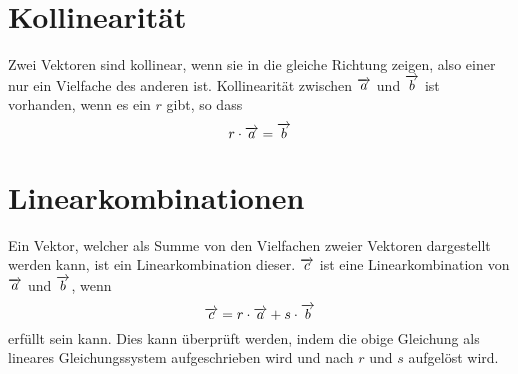 \documentclass{article}
\begin{document}
\section{Kollinearität} 
Zwei Vektoren sind kollinear, wenn sie in die gleiche Richtung zeigen, also einer nur ein Vielfache des anderen ist. Kollinearität zwischen $\overrightarrow{a}$ und $\overrightarrow{b}$ ist vorhanden, wenn es ein $r$ gibt, so dass 
\[ 
 r \cdot \overrightarrow{a} = \overrightarrow{b}
\]
 
\section{Linearkombinationen} 
Ein Vektor, welcher als Summe von den Vielfachen zweier Vektoren dargestellt werden kann, ist ein Linearkombination dieser. $\overrightarrow{c}$ ist eine Linearkombination von $\overrightarrow{a}$ und $\overrightarrow{b}$, wenn
\[
 \overrightarrow{c} = r \cdot \overrightarrow{a} + s \cdot \overrightarrow{b} 
\]
erfüllt sein kann. Dies kann überprüft werden, indem die obige Gleichung als lineares Gleichungssystem aufgeschrieben wird  und nach $r$ und $s$ aufgelöst wird.
 
\end{document}
